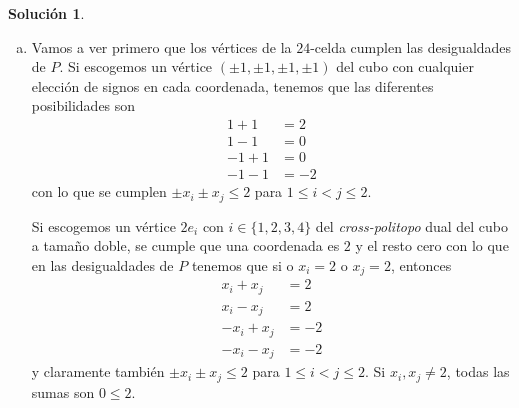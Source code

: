 \documentclass[10pt]{article}
\theoremstyle{definition}
\newtheorem*{sol}{Solución}
\begin{document}
\begin{sol}\leavevmode
\begin{enumerate}[(a)]
    \item Vamos a ver primero que los vértices de la $24$-celda cumplen las desigualdades de $P$.
    Si escogemos un vértice $(\pm 1,\pm 1,\pm 1,\pm 1)$ del cubo con cualquier elección de signos en cada coordenada, tenemos que las diferentes posibilidades son
    \begin{align*}
    1+1 & = 2\\
    1-1 & = 0\\
    -1+1 & = 0\\
    -1-1 & = -2
    \end{align*}
    con lo que se cumplen $\pm x_i\pm x_j\leq 2$ para $1\leq i<j\leq 2$.
    
    Si escogemos un vértice $2e_i$ con $i\in\{1,2,3,4\}$ del \textit{cross-politopo} dual del cubo a tamaño doble, se cumple que una coordenada es $2$ y el resto cero con lo que en las desigualdades de $P$ tenemos que si o $x_i=2$ o $x_j=2$, entonces
    \begin{align*}
    x_i+x_j & = 2\\
    x_i-x_j & = 2\\
    -x_i+x_j & = -2\\
    -x_i-x_j & = -2
    \end{align*}
    y claramente también $\pm x_i\pm x_j\leq 2$ para $1\leq i<j\leq 2$. Si $x_i,x_j\neq 2$, todas las sumas son $0\leq 2$.
    

\end{enumerate}
\end{sol}
\end{document}
